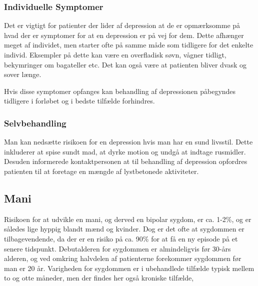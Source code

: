 \subsubsection{Individuelle Symptomer}
Det er vigtigt for patienter der lider af depression at de er opmærksomme på hvad der er symptomer for at en depression er på vej for dem.
Dette afhænger meget af individet, men starter ofte på samme måde som tidligere for det enkelte individ.
Eksempler på dette kan være en overfladisk søvn, vågner tidligt, bekymringer om bagateller etc.
Det kan også være at patienten bliver dvask og sover længe.

Hvis disse symptomer opfanges kan behandling af depressionen påbegyndes tidligere i forløbet og i bedste tilfælde forhindres.
\subsubsection{Selvbehandling}
Man kan nedsætte risikoen for en depression hvis man har en sund livsstil.
Dette inkluderer at spise sundt mad, at dyrke motion og undgå at indtage rusmidler.
Desuden informerede kontaktpersonen \citet{misc:janne-rasmussen} at til behandling af depression opfordres patienten til at foretage en mængde af lystbetonede aktiviteter.

\subsection{Mani}
Risikoen for at udvikle en mani, og derved en bipolar sygdom, er ca. 1-2\%, og er således lige hyppig blandt mænd og kvinder.
Dog er det ofte at sygdommen er tilbagevendende, da der er en risiko på ca. 90\% for at få en ny episode på et senere tidspunkt.
Debutalderen for sygdommen er almindeligvis før 30-års alderen, og ved omkring halvdelen af patienterne forekommer sygdommen før man er 20 år.
Varigheden for sygdommen er i ubehandlede tilfælde typisk mellem to og otte måneder, men der findes her også kroniske tilfælde,

